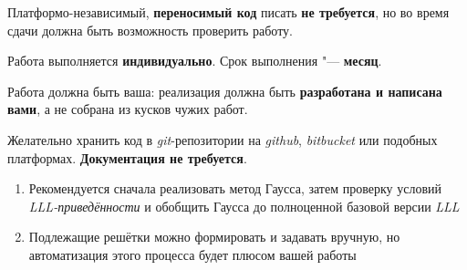 \documentclass{ca-capstone}
\begin{document}
Платформо-независимый, \textbf{переносимый код} писать \textbf{не требуется}, но во время сдачи
должна быть возможность проверить работу.

\schedule
Работа выполняется \textbf{индивидуально}. Срок выполнения "--- \textbf{месяц}.

Работа должна быть ваша: реализация должна быть \textbf{разработана и написана вами}, а не
собрана из кусков чужих работ.

Желательно хранить код в \emph{git}-репозитории на \emph{github}, \emph{bitbucket} или подобных
платформах. \textbf{Документация не требуется}.

\remarks
\begin{enumerate}
  \item Рекомендуется сначала реализовать метод Гаусса, затем проверку условий
    \emph{LLL-приведённости} и обобщить Гаусса до полноценной базовой версии \emph{LLL}
  \item Подлежащие решётки можно формировать и задавать вручную, но автоматизация этого процесса
    будет плюсом вашей работы
\end{enumerate}

\end{document}
